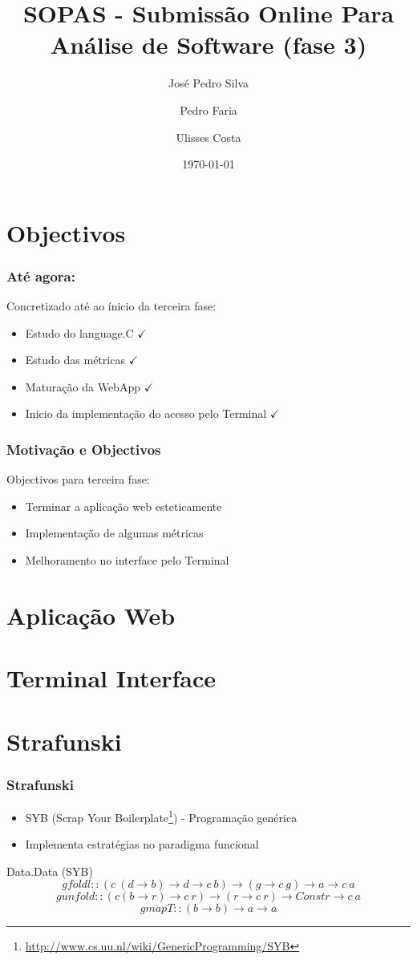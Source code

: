 \documentclass{beamer}
\title{SOPAS - Submissão Online Para Análise de Software (fase 3)}
\author{José Pedro Silva \and
Pedro Faria \and
Ulisses Costa
}
\date{\today}
\institute{Engenharia de Linguagens\\
Projecto integrado
}
\begin{document}
\begin{frame}
   \titlepage
\end{frame}

\section{Objectivos}
\begin{frame} \frametitle{Até agora:}
Concretizado até ao ínicio da terceira fase:
\begin{itemize}
\item Estudo do language.C {\color{green}$\checkmark$}
\item Estudo das métricas {\color{green}$\checkmark$}
\item Maturação da WebApp {\color{green}$\checkmark$}
\item Inicio da implementação do acesso pelo Terminal {\color{green}$\checkmark$}
\end{itemize}
\end{frame}

\begin{frame} \frametitle{Motivação e Objectivos}
Objectivos para terceira fase:
\begin{itemize}
\item Terminar a aplicação web esteticamente
\item Implementação de algumas métricas
\item Melhoramento no interface pelo Terminal
\end{itemize}
\end{frame}

\section{Aplicação Web}

\section{Terminal Interface}

\section{Strafunski}
\begin{frame}[fragile] \frametitle{Strafunski}
\begin{itemize}
\item SYB (Scrap Your Boilerplate\footnote{\url{http://www.cs.uu.nl/wiki/GenericProgramming/SYB}}) - Programação genérica
\item Implementa estratégias no paradigma funcional
\end{itemize}

\begin{block}{Data.Data (SYB)}
$$gfoldl :: (c~(d \rightarrow b) \rightarrow d \rightarrow c~b) \rightarrow (g \rightarrow c~g) \rightarrow a \rightarrow c~a$$
$$gunfold :: (c (b \rightarrow r) \rightarrow c~r) \rightarrow (r \rightarrow c~r) \rightarrow Constr \rightarrow c~a$$
$$gmapT :: (b \rightarrow b) \rightarrow a \rightarrow a$$
\end{block}
\end{frame}
\end{document}
